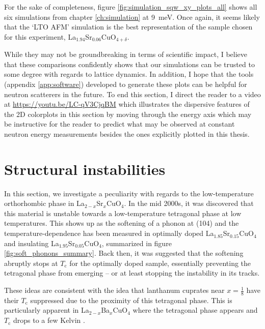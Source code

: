 For the sake of completeness, figure \ref{fig:simulation_sqw_xy_plots_all} shows all six simulations from chapter \ref{ch:simulation} at \SI{9}{\milli\eV}. Once again, it seems likely that the `LTO AFM' simulation is the best representation of the sample chosen for this experiment, La$_{1.94}$Sr$_{0.06}$CuO$_{4+\delta}$.

While they may not be groundbreaking in terms of scientific impact, I believe that these comparisons confidently shows that our simulations can be trusted to some degree with regards to lattice dynamics. In addition, I hope that the tools (appendix \ref{app:software}) developed to generate these plots can be helpful for neutron scatterers in the future. To end this section, I direct the reader to a video at \url{https://youtu.be/LC-qV3CjqBM} which illustrates the dispersive features of the 2D colorplots in this section by moving through the energy axis which may be instructive for the reader to predict what may be observed at constant neutron energy measurements besides the ones explicitly plotted in this thesis.

\section{Structural instabilities}
In this section, we investigate a peculiarity with regards to the low-temperature orthorhombic phase in La$_{2-x}$Sr$_x$CuO$_{4}$. In the mid 2000s, it was discovered that this material is unstable towards a low-temperature tetragonal phase at low temperatures. This shows up as the softening of a phonon at (104) and the temperature-dependence has been measured in optimally doped La$_{1.85}$Sr$_{0.15}$CuO$_4$ and insulating La$_{1.95}$Sr$_{0.05}$CuO$_4$, summarized in figure \ref{fig:soft_phonons_summary}. Back then, it was suggested that the softening abruptly stops at $T_\text{c}$ for the optimally doped sample, essentially preventing the tetragonal phase from emerging -- or at least stopping the instability in its tracks.

These ideas are consistent with the idea that lanthanum cuprates near $x=\frac{1}{8}$ have their $T_\text{c}$ suppressed due to the proximity of this tetragonal phase. This is particularly apparent in La$_{2-x}$Ba$_x$CuO$_4$ where the tetragonal phase appears and $T_\text{c}$ drops to a few Kelvin \cite{Hucker2012}.

